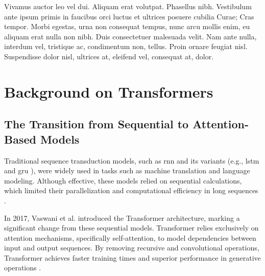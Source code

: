 \cleardoublepage
\label{chap:back}

Vivamus auctor leo vel dui. Aliquam erat volutpat. Phasellus nibh. Vestibulum ante ipsum primis in faucibus orci luctus et ultrices posuere cubilia Curae; Cras tempor. Morbi egestas, urna non consequat tempus, nunc arcu mollis enim, eu aliquam erat nulla non nibh. Duis consectetuer malesuada velit. Nam ante nulla, interdum vel, tristique ac, condimentum non, tellus. Proin ornare feugiat nisl. Suspendisse dolor nisl, ultrices at, eleifend vel, consequat at, dolor.

\section{Background on Transformers} \subsection{The Transition from Sequential to Attention-Based Models}  
Traditional sequence transduction models, such as \ac{rnn} and its variants (e.g., \ac{lstm} \cite{hochreiter1997lstm} and \ac{gru} \cite{cho2014gru}), were widely used in tasks such as machine translation and language modeling. Although effective, these models relied on sequential calculations, which limited their parallelization and computational efficiency in long sequences \cite{vaswani2017attention}.

In 2017, Vaswani et al. introduced the Transformer architecture, marking a significant change from these sequential models. Transformer relies exclusively on attention mechanisms, specifically self-attention, to model dependencies between input and output sequences. By removing recursive and convolutional operations, Transformer achieves faster training times and superior performance in generative operations \cite{vaswani2017attention}.

